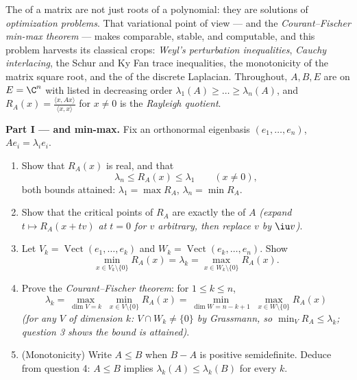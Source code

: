 \begin{problem}\label{pb:b2:hermitian:1}
The  of a  matrix are not just roots of a
polynomial: they are solutions of \emph{optimization problems}.
That variational point of view ---  and the
\emph{Courant--Fischer min-max theorem} --- makes  comparable, stable, and
computable, and this problem harvests its classical crops:
\emph{Weyl's perturbation inequalities}, \emph{Cauchy interlacing}, the Schur and Ky Fan
trace inequalities, the monotonicity of the matrix square root,
and the  of the discrete Laplacian. Throughout, $A, B,
E$ are  on $E = \C^n$ with  listed in
decreasing order $\lambda_1(A) \geq \dots \geq \lambda_n(A)$,
and $R_A(x) = \frac{\langle x, Ax\rangle}{\langle x, x\rangle}$
for $x \neq 0$ is the \emph{Rayleigh quotient}.

\medskip
\noindent\textbf{Part I ---  and min-max.}
Fix an orthonormal eigenbasis $(e_1, \dots, e_n)$, $Ae_i =
\lambda_ie_i$.
\begin{enumerate}
  \item Show that $R_A(x)$ is real, and that
        \[
        \lambda_n \leq R_A(x) \leq \lambda_1
        \qquad (x \neq 0),
        \]
        both bounds attained: $\lambda_1 = \max R_A$,
        $\lambda_n = \min R_A$.
  \item Show that the critical points of $R_A$ are exactly the
         of $A$ \emph{(expand $t \mapsto R_A(x +
        tv)$ at $t = 0$ for $v$ arbitrary, then replace $v$ by
        $\iu v$)}.
  \item Let $V_k = \operatorname{Vect}(e_1, \dots, e_k)$ and
        $W_k = \operatorname{Vect}(e_k, \dots, e_n)$. Show
        \[
        \min_{x \in V_k\setminus\{0\}} R_A(x) = \lambda_k
        = \max_{x \in W_k\setminus\{0\}} R_A(x) .
        \]
  \item Prove the \emph{Courant--Fischer theorem}: for $1 \leq
        k \leq n$,
        \[
        \lambda_k = \max_{\dim V = k}\;\min_{x \in
        V\setminus\{0\}} R_A(x)
        = \min_{\dim W = n-k+1}\;\max_{x \in
        W\setminus\{0\}} R_A(x)
        \]
        \emph{(for any $V$ of dimension $k$: $V \cap W_k \neq
        \{0\}$ by Grassmann, so $\min_V R_A \leq \lambda_k$;
        question 3 shows the bound is attained)}.
  \item (Monotonicity) Write $A \leq B$ when $B - A$ is
        positive semidefinite. Deduce from question 4: $A \leq
        B$ implies $\lambda_k(A) \leq \lambda_k(B)$ for every
        $k$.
\end{enumerate}


\end{problem}
